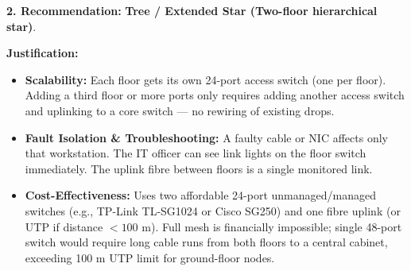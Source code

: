 \documentclass[11pt]{article}
\begin{document}
\begin{exoresolu}
\textbf{2. Recommendation:} \textbf{Tree / Extended Star (Two-floor hierarchical star)}.

\textbf{Justification:}
\begin{itemize}
\item \textbf{Scalability:} Each floor gets its own 24-port access switch (one per floor). Adding a third floor or more ports only requires adding another access switch and uplinking to a core switch — no rewiring of existing drops.
\item \textbf{Fault Isolation \& Troubleshooting:} A faulty cable or NIC affects only that workstation. The IT officer can see link lights on the floor switch immediately. The uplink fibre between floors is a single monitored link.
\item \textbf{Cost-Effectiveness:} Uses two affordable 24-port unmanaged/managed switches (e.g., TP-Link TL-SG1024 or Cisco SG250) and one fibre uplink (or UTP if distance $<100$ m). Full mesh is financially impossible; single 48-port switch would require long cable runs from both floors to a central cabinet, exceeding 100 m UTP limit for ground-floor nodes.
\end{itemize}


\end{exoresolu}
\end{document}
